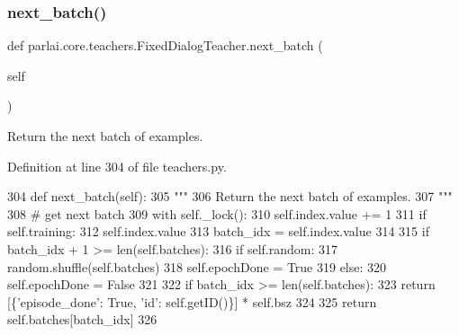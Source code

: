 \subsubsection{\texorpdfstring{next\+\_\+batch()}{next\_batch()}}
{\footnotesize\ttfamily def parlai.\+core.\+teachers.\+Fixed\+Dialog\+Teacher.\+next\+\_\+batch (\begin{DoxyParamCaption}\item[{}]{self }\end{DoxyParamCaption})}

\begin{DoxyVerb}Return the next batch of examples.
\end{DoxyVerb}
 

Definition at line 304 of file teachers.\+py.


\begin{DoxyCode}
304     \textcolor{keyword}{def }next\_batch(self):
305         \textcolor{stringliteral}{"""}
306 \textcolor{stringliteral}{        Return the next batch of examples.}
307 \textcolor{stringliteral}{        """}
308         \textcolor{comment}{# get next batch}
309         with self.\_lock():
310             self.index.value += 1
311             \textcolor{keywordflow}{if} self.training:
312                 self.index.value %
313             batch\_idx = self.index.value
314 
315             \textcolor{keywordflow}{if} batch\_idx + 1 >= len(self.batches):
316                 \textcolor{keywordflow}{if} self.random:
317                     random.shuffle(self.batches)
318                 self.epochDone = \textcolor{keyword}{True}
319             \textcolor{keywordflow}{else}:
320                 self.epochDone = \textcolor{keyword}{False}
321 
322         \textcolor{keywordflow}{if} batch\_idx >= len(self.batches):
323             \textcolor{keywordflow}{return} [\{\textcolor{stringliteral}{'episode\_done'}: \textcolor{keyword}{True}, \textcolor{stringliteral}{'id'}: self.getID()\}] * self.bsz
324 
325         \textcolor{keywordflow}{return} self.batches[batch\_idx]
326 
\end{DoxyCode}
\mbox{\label{classparlai_1_1core_1_1teachers_1_1FixedDialogTeacher_a7fccfc09aef3510f8bb9834398eff8e9}} 
